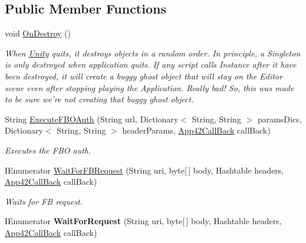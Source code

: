 \subsection*{Public Member Functions}
\begin{DoxyCompactItemize}
\item 
void \hyperlink{classcom_1_1shephertz_1_1app42_1_1paas_1_1sdk_1_1csharp_1_1connection_1_1_r_e_s_t_connector_w_w_w_adf9559b7793d5ce6b14e574b5245e406}{On\+Destroy} ()
\begin{DoxyCompactList}\small\item\em When \hyperlink{namespace_unity}{Unity} quits, it destroys objects in a random order. In principle, a Singleton is only destroyed when application quits. If any script calls Instance after it have been destroyed, it will create a buggy ghost object that will stay on the Editor scene even after stopping playing the Application. Really bad! So, this was made to be sure we're not creating that buggy ghost object. \end{DoxyCompactList}\item 
String \hyperlink{classcom_1_1shephertz_1_1app42_1_1paas_1_1sdk_1_1csharp_1_1connection_1_1_r_e_s_t_connector_w_w_w_ae8ad93846fa755bad74ffa99568e540d}{Execute\+F\+B\+O\+Auth} (String url, Dictionary$<$ String, String $>$ params\+Dics, Dictionary$<$ String, String $>$ header\+Params, \hyperlink{interfacecom_1_1shephertz_1_1app42_1_1paas_1_1sdk_1_1csharp_1_1_app42_call_back}{App42\+Call\+Back} call\+Back)
\begin{DoxyCompactList}\small\item\em Executes the F\+B\+O auth. \end{DoxyCompactList}\item 
I\+Enumerator \hyperlink{classcom_1_1shephertz_1_1app42_1_1paas_1_1sdk_1_1csharp_1_1connection_1_1_r_e_s_t_connector_w_w_w_a89be7c24ddb6d8a15315b4dd59f46551}{Wait\+For\+F\+B\+Request} (String uri, byte\mbox{[}$\,$\mbox{]} body, Hashtable headers, \hyperlink{interfacecom_1_1shephertz_1_1app42_1_1paas_1_1sdk_1_1csharp_1_1_app42_call_back}{App42\+Call\+Back} call\+Back)
\begin{DoxyCompactList}\small\item\em Waits for F\+B request. \end{DoxyCompactList}\item 
\hypertarget{classcom_1_1shephertz_1_1app42_1_1paas_1_1sdk_1_1csharp_1_1connection_1_1_r_e_s_t_connector_w_w_w_abbe884a799bb5a11c0e6c2790b058c63}{I\+Enumerator {\bfseries Wait\+For\+Request} (String uri, byte\mbox{[}$\,$\mbox{]} body, Hashtable headers, \hyperlink{interfacecom_1_1shephertz_1_1app42_1_1paas_1_1sdk_1_1csharp_1_1_app42_call_back}{App42\+Call\+Back} call\+Back)}\label{classcom_1_1shephertz_1_1app42_1_1paas_1_1sdk_1_1csharp_1_1connection_1_1_r_e_s_t_connector_w_w_w_abbe884a799bb5a11c0e6c2790b058c63}


\end{DoxyCompactItemize}
